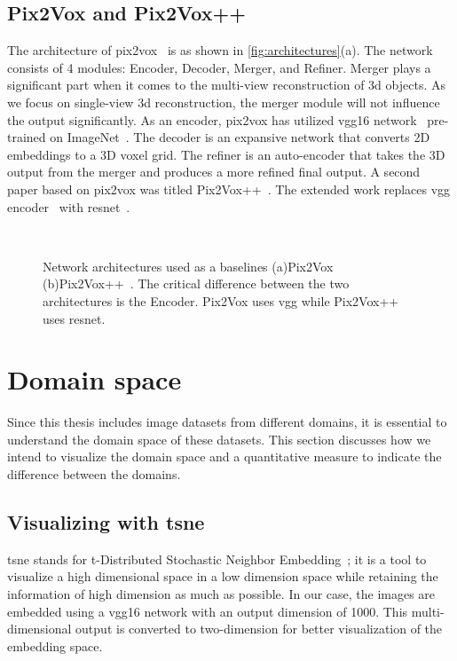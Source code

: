 \subsection{Pix2Vox and Pix2Vox++}\label{subsec:pix2vox-and-pix2vox++}
The architecture of pix2vox~\cite{Xie_2019} is as shown in \autoref{fig:architectures}(a).
The network consists of 4 modules: Encoder, Decoder, Merger, and Refiner.
Merger plays a significant part when it comes to the multi-view reconstruction of 3d objects.
As we focus on single-view 3d reconstruction, the merger module will not influence the output significantly.
As an encoder, pix2vox has utilized \gls{vgg}16 network~\cite{simonyan2015deep} pre-trained on ImageNet~\cite{Deng2009ImageNetAL}.
The decoder is an expansive network that converts 2D embeddings to a 3D voxel grid.
The refiner is an auto-encoder that takes the 3D output from the merger and produces a more refined final output.
A second paper based on pix2vox was titled Pix2Vox++~\cite{Xie_2020}.
The extended work replaces \gls{vgg} encoder~\cite{simonyan2015deep} with \gls{resnet}~\cite{He2016DeepRL}.

\begin{figure}[!ht]
    \centering
    \quad
    \\
    \caption{Network architectures used as a baselines (a)Pix2Vox~\cite{Xie_2019} (b)Pix2Vox++~\cite{Xie_2020}.
    The critical difference between the two architectures is the Encoder. Pix2Vox uses \gls{vgg} while Pix2Vox++ uses \gls{resnet}.}
    \label{fig:architectures}
\end{figure}

\section{Domain space}\label{sec:domain-space}

Since this thesis includes image datasets from different domains, it is essential to understand the domain space of these datasets.
This section discusses how we intend to visualize the domain space and a quantitative measure to indicate the difference between the domains.

\subsection{Visualizing with \gls{tsne}}\label{subsec:visualizing-with-tsne}
\gls{tsne} stands for t-Distributed Stochastic Neighbor Embedding~\cite{vanDerMaaten2008}; it is a tool to visualize a high dimensional space in a low dimension space while retaining the information of high dimension as much as possible.
In our case, the images are embedded using a \gls{vgg}16 network with an output dimension of 1000.
This multi-dimensional output is converted to two-dimension for better visualization of the embedding space.

